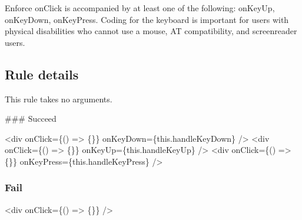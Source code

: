 Enforce {\ttfamily on\+Click} is accompanied by at least one of the following\+: {\ttfamily on\+Key\+Up}, {\ttfamily on\+Key\+Down}, {\ttfamily on\+Key\+Press}. Coding for the keyboard is important for users with physical disabilities who cannot use a mouse, AT compatibility, and screenreader users.

\subsection*{Rule details}

This rule takes no arguments.

\#\#\# Succeed 
\begin{DoxyCode}
<div onClick=\{() => \{\}\} onKeyDown=\{this.handleKeyDown\} />
<div onClick=\{() => \{\}\} onKeyUp=\{this.handleKeyUp\} />
<div onClick=\{() => \{\}\} onKeyPress=\{this.handleKeyPress\} />
\end{DoxyCode}


\subsubsection*{Fail}


\begin{DoxyCode}
<div onClick=\{() => \{\}\} />
\end{DoxyCode}
 